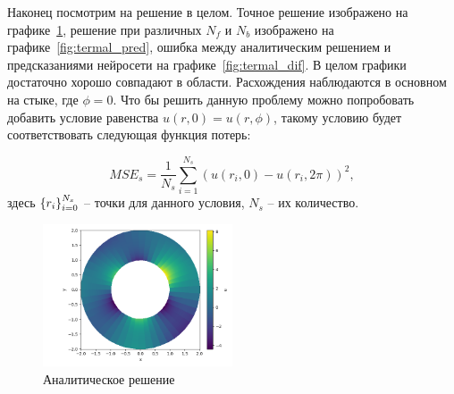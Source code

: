 \documentclass[a4paper,14pt]{extarticle} %
\begin{document}


% 

Наконец посмотрим на решение в целом. Точное решение изображено на графике~\ref{fig:termal_analit}, решение при различных $N_f$ и $N_b$ изображено на графике~\ref{fig:termal_pred}, ошибка между аналитическим решением и предсказаниями нейросети на графике~\ref{fig:termal_dif}. В целом графики достаточно хорошо совпадают в области. Расхождения наблюдаются в основном на стыке, где $\phi=0$. Что бы решить данную проблему можно попробовать добавить условие равенства $u(r, 0) = u(r, \phi)$, такому условию будет соответствовать следующая функция потерь:

\begin{equation}
    MSE_s = \frac{1}{N_s}\sum_{i=1}^{N_s} (u(r_i, 0) - u(r_i, 2\pi))^2,
\end{equation}
здесь ${\left\{ r_i \right\}}_{i=0}^{N_s}$ -- точки для данного условия, $N_s$ -- их количество.

\begin{figure}[ht]
    \center
    \includegraphics[width=0.5\textwidth]{../plots/termal/solut analit.png}
    \caption{Аналитическое решение}
    \label{fig:termal_analit}
\end{figure}
\end{document}

